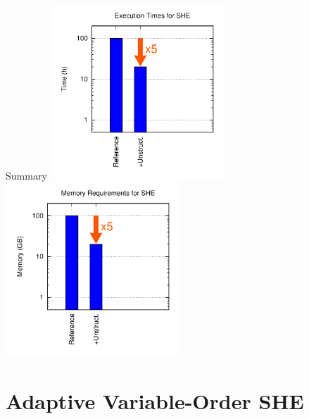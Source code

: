 \documentclass[usepdftitle=false,10pt]{beamer}
\renewcommand{\vector}[1]{\boldsymbol{#1}}
\begin{document}
\begin{frame}{Summary}
 \includegraphics[width=0.49\textwidth]{summary-exec-2}
 \includegraphics[width=0.49\textwidth]{summary-memory-2}
\end{frame}




%
%

\section{Adaptive Variable-Order SHE}

% 
% 
\end{document}
